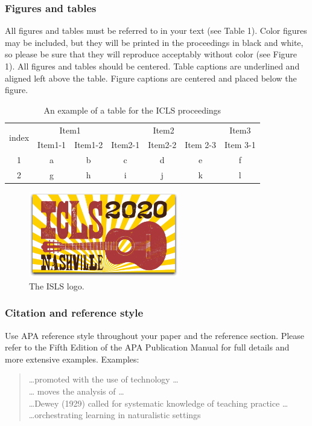 \documentclass{article}
\begin{document}
\subsubsection{Figures and tables}
All figures and tables must be referred to in your text (see Table 1). Color figures may be included, but they will be printed in the proceedings in black and white, so please be sure that they will reproduce acceptably without color (see Figure 1). All figures and tables should be centered. Table captions are underlined and aligned left
above the table. Figure captions are centered and placed below the figure.

\begin{table}[H]
\caption{An example of a table for the ICLS proceedings}

\centering
\begin{tabular}{c || c | c | c | c | c | c}
\hline
\multirow{2}{*}{index} & \multicolumn{2}{c|}{Item1}&\multicolumn{3}{c|}{Item2} & Item3 \\ \cline{2-7}
& Item1-1 & Item1-2 & Item2-1 & Item2-2 & Item 2-3 & Item 3-1 \\ \hline \hline 
1 & a & b & c & d & e & f \\ \hline
2 & g & h & i & j & k & l \\ \hline
\end{tabular}
\end{table}

\begin{figure}[H]
\begin{center}
\includegraphics[width=.25\textwidth]{logo.png}
\end{center}
\caption{The ISLS logo.}
\end{figure}

\subsubsection{Citation and reference style}
Use APA reference style throughout your paper and the reference section. Please refer to the Fifth Edition of the APA Publication Manual for full details and more extensive examples. Examples:

\begin{quotation}
\dots promoted with the use of technology \parencite[e.g.,][]{hawkins_tools_1987} \dots \\
\dots \textcite{lave_cognition_1988} moves the analysis of \dots \\
\dots Dewey (1929) called for systematic knowledge of teaching practice \dots \\
\dots orchestrating learning in naturalistic settings \parencite{brown_design_1992, bruner_postscript_1999}
\end{quotation}

\renewcommand{\notesname}{Endnotes (use Heading 1)} %
\theendnotes
\end{document}
